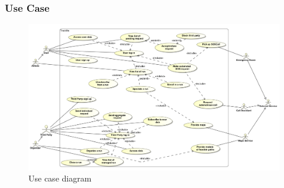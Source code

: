 \subsubsection{Use Case}
\begin{figure}[H]
\includegraphics[width=\linewidth]{Images/usecase}
\caption{Use case diagram}
\label{fig:usecasediagram}
\end{figure}